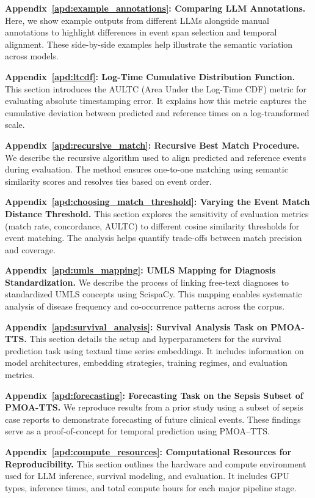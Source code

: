 \documentclass{article}
\begin{document}
\textbf{Appendix~\ref{apd:example_annotations}: Comparing LLM Annotations.} Here, we show example outputs from different LLMs alongside manual annotations to highlight differences in event span selection and temporal alignment. These side-by-side examples help illustrate the semantic variation across models.

\textbf{Appendix~\ref{apd:ltcdf}: Log-Time Cumulative Distribution Function.} This section introduces the AULTC (Area Under the Log-Time CDF) metric for evaluating absolute timestamping error. It explains how this metric captures the cumulative deviation between predicted and reference times on a log-transformed scale.

\textbf{Appendix~\ref{apd:recursive_match}: Recursive Best Match Procedure.} We describe the recursive algorithm used to align predicted and reference events during evaluation. The method ensures one-to-one matching using semantic similarity scores and resolves ties based on event order.

\textbf{Appendix~\ref{apd:choosing_match_threshold}: Varying the Event Match Distance Threshold.} This section explores the sensitivity of evaluation metrics (match rate, concordance, AULTC) to different cosine similarity thresholds for event matching. The analysis helps quantify trade-offs between match precision and coverage.

\textbf{Appendix~\ref{apd:umls_mapping}: UMLS Mapping for Diagnosis Standardization.} We describe the process of linking free-text diagnoses to standardized UMLS concepts using ScispaCy. This mapping enables systematic analysis of disease frequency and co-occurrence patterns across the corpus.

\textbf{Appendix~\ref{apd:survival_analysis}: Survival Analysis Task on PMOA-TTS.} This section details the setup and hyperparameters for the survival prediction task using textual time series embeddings. It includes information on model architectures, embedding strategies, training regimes, and evaluation metrics.

\textbf{Appendix~\ref{apd:forecasting}: Forecasting Task on the Sepsis Subset of PMOA-TTS.} We reproduce results from a prior study using a subset of sepsis case reports to demonstrate forecasting of future clinical events. These findings serve as a proof-of-concept for temporal prediction using PMOA–TTS.

\textbf{Appendix~\ref{apd:compute_resources}: Computational Resources for Reproducibility.} This section outlines the hardware and compute environment used for LLM inference, survival modeling, and evaluation. It includes GPU types, inference times, and total compute hours for each major pipeline stage.
\end{document}
